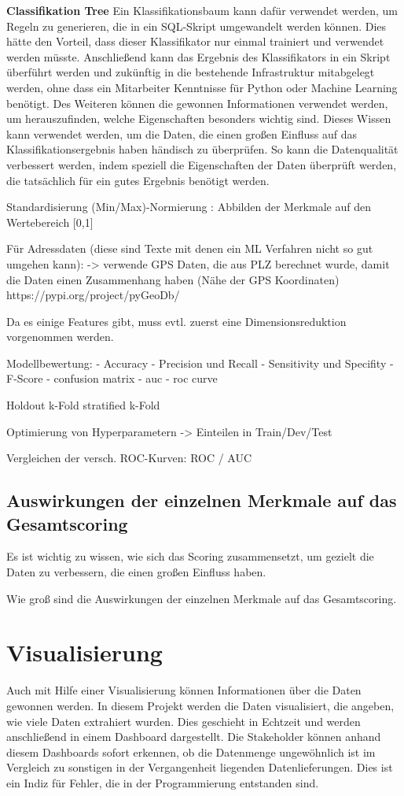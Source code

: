 \textbf{Classifikation Tree}
Ein Klassifikationsbaum kann dafür verwendet werden, um Regeln zu generieren, die in ein SQL-Skript umgewandelt werden können.
Dies hätte den Vorteil, dass dieser Klassifikator nur einmal trainiert und verwendet werden müsste.
Anschließend kann das Ergebnis des Klassifikators in ein Skript überführt werden und zukünftig in die bestehende Infrastruktur mitabgelegt werden, ohne dass ein Mitarbeiter Kenntnisse für Python oder Machine Learning benötigt. 
Des Weiteren können die gewonnen Informationen verwendet werden, um herauszufinden, welche Eigenschaften besonders wichtig sind.
Dieses Wissen kann verwendet werden, um die Daten, die einen großen Einfluss auf das Klassifikationsergebnis haben händisch zu überprüfen. 
So kann die Datenqualität verbessert werden, indem speziell die Eigenschaften der Daten überprüft werden, die tatsächlich für ein gutes Ergebnis benötigt werden.





Standardisierung
(Min/Max)-Normierung : Abbilden der Merkmale auf den Wertebereich [0,1]


Für Adressdaten (diese sind Texte mit denen ein ML Verfahren nicht so gut umgehen kann):
-> verwende GPS Daten, die aus PLZ berechnet wurde, damit die Daten einen Zusammenhang haben (Nähe der GPS Koordinaten)
https://pypi.org/project/pyGeoDb/

Da es einige Features gibt, muss evtl. zuerst eine Dimensionsreduktion vorgenommen werden.


Modellbewertung:
- Accuracy
- Precision und Recall
- Sensitivity und Specifity
- F-Score
- confusion matrix
- auc - roc curve


Holdout
k-Fold
stratified k-Fold

Optimierung von Hyperparametern 
-> Einteilen in Train/Dev/Test

Vergleichen der versch. ROC-Kurven:
ROC / AUC

\subsection{Auswirkungen der einzelnen Merkmale auf das Gesamtscoring}
Es ist wichtig zu wissen, wie sich das Scoring zusammensetzt, um gezielt die Daten zu verbessern, die einen großen Einfluss haben. 

Wie groß sind die Auswirkungen der einzelnen Merkmale auf das Gesamtscoring. 

\section{Visualisierung}
Auch mit Hilfe einer Visualisierung können Informationen über die Daten gewonnen werden.
In diesem Projekt werden die Daten visualisiert, die angeben, wie viele Daten extrahiert wurden.
Dies geschieht in Echtzeit und werden anschließend in einem Dashboard dargestellt.
Die Stakeholder können anhand diesem Dashboards sofort erkennen, ob die Datenmenge ungewöhnlich ist im Vergleich zu sonstigen in der Vergangenheit liegenden Datenlieferungen.
Dies ist ein Indiz für Fehler, die in der Programmierung entstanden sind.



